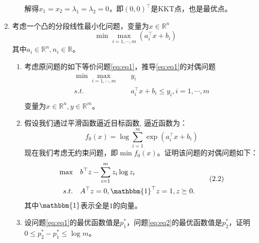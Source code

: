 \documentclass[cn,hazy,cyan,11pt,normal]{elegantnote}
\begin{document}
\begin{enumerate}
\begin{enumerate}
                    \vspace{0.2cm}解得$x_1=x_2=\lambda_1=\lambda_2=0$，即$(0,0)^{\top}$是KKT点，也是最优点。
            \end{enumerate}

        \item {\color{c1}\vspace{0.5cm}考虑一个凸的分段线性最小化问题，变量为$x\in\mathbb{R}^n$
            \[\min\max_{i=1,\cdots,m}(a^{\top}_i x+b_i)\]
            其中$a_i\in\mathbb{R}^n,n_i\in\mathbb{R}$。

            \begin{enumerate}
                \item 考虑原问题的如下等价问题\ref{eq:eq1}，推导\ref{eq:eq1}的对偶问题
                    \begin{equation}
                        \begin{aligned}
                        \min\max_{i=1,\cdots,m}\quad& y_i\\
                        s.t.\quad& a^{\top}_i x+b_i\leq y_i,i=1,\cdots,m\\
                        \end{aligned}
                        \tag{2.1}
                        \label{eq:eq1}
                    \end{equation}
                    变量为$x\in\mathbb{R}^n,y\in\mathbb{R}^m$。
                \item 假设我们通过平滑函数逼近目标函数, 逼近函数为：
                    \[f_0(x)=\log\sum_{i=1}^m \exp(a_i^{\top}x+b_i)\]
                    现在我们考虑无约束问题，即$\min f_0(x)$。证明该问题的对偶问题如下：
                    \begin{equation}
                        \begin{aligned}
                        \max\quad& b^{\top}z-\sum_{i=1}^m z_i\log z_i\\
                        s.t.\quad& A^{\top}z=0,\mathbbm{1}^{\top}z=1,z\succeq0.\\
                        \end{aligned}
                        \tag{2.2}
                        \label{eq:eq2}
                    \end{equation}
                    其中$\mathbbm{1}$表示全是$1$的向量。
                \item 设问题\ref{eq:eq1}的最优函数值是$p_1^*$，问题\ref{eq:eq2}的最优函数值是$p_2^*$，证明$0\leq p_2^*-p_1^*\leq \log m$。
            \end{enumerate}}


\end{enumerate}
\end{document}

